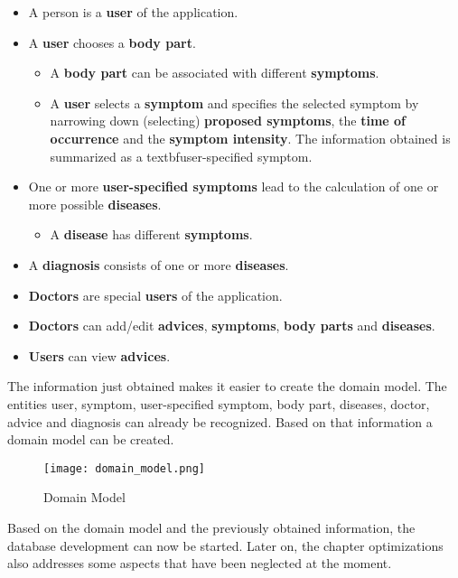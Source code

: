 \begin{itemize}
	\item A person is a \textbf{user} of the application.
	\item A \textbf{user} chooses a \textbf{body part}.
	\begin{itemize}
		\item A \textbf{body part} can be associated with different \textbf{symptoms}.
		\item A \textbf{user} selects a \textbf{symptom} and specifies the selected symptom by narrowing down (selecting) \textbf{proposed symptoms}, the \textbf{time of occurrence} and the \textbf{symptom intensity}. The information obtained is summarized as a textbf{user-specified symptom}.
	\end{itemize}
	\item One or more \textbf{user-specified symptoms} lead to the calculation of one or more possible \textbf{diseases}.
	\begin{itemize}
		\item A \textbf{disease} has different \textbf{symptoms}.
	\end{itemize}
	\item A \textbf{diagnosis} consists of one or more \textbf{diseases}.
	\item \textbf{Doctors} are special \textbf{users} of the application.
	\item \textbf{Doctors} can add/edit \textbf{advices}, \textbf{symptoms}, \textbf{body parts} and \textbf{diseases}.
	\item \textbf{Users} can view \textbf{advices}.  
\end{itemize}
\noindent
The information just obtained makes it easier to create the domain model. The entities user, symptom, user-specified symptom, body part, diseases, doctor, advice and diagnosis can already be recognized. Based on that information a domain model can be created. 
\begin{figure}[H]
	\centering
	\texttt{[image: domain\_model.png]}
	\caption[Domain Model]{Domain Model}
\end{figure}
\noindent
Based on the domain model and the previously obtained information, the database development can now be started. Later on, the chapter optimizations also addresses some aspects that have been neglected at the moment.

